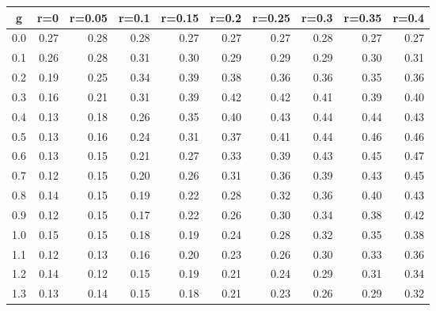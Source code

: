 %
\begin{table}[!tbp]
 \begin{center}
 \begin{tabular}{rrrrrrrrrr}\hline\hline
\multicolumn{1}{c}{g}&\multicolumn{1}{c}{r=0}&\multicolumn{1}{c}{r=0.05}&\multicolumn{1}{c}{r=0.1}&\multicolumn{1}{c}{r=0.15}&\multicolumn{1}{c}{r=0.2}&\multicolumn{1}{c}{r=0.25}&\multicolumn{1}{c}{r=0.3}&\multicolumn{1}{c}{r=0.35}&\multicolumn{1}{c}{r=0.4}\tabularnewline
\hline
0.0&0.27&0.28&0.28&0.27&0.27&0.27&0.28&0.27&0.27\tabularnewline
0.1&0.26&0.28&0.31&0.30&0.29&0.29&0.29&0.30&0.31\tabularnewline
0.2&0.19&0.25&0.34&0.39&0.38&0.36&0.36&0.35&0.36\tabularnewline
0.3&0.16&0.21&0.31&0.39&0.42&0.42&0.41&0.39&0.40\tabularnewline
0.4&0.13&0.18&0.26&0.35&0.40&0.43&0.44&0.44&0.43\tabularnewline
0.5&0.13&0.16&0.24&0.31&0.37&0.41&0.44&0.46&0.46\tabularnewline
0.6&0.13&0.15&0.21&0.27&0.33&0.39&0.43&0.45&0.47\tabularnewline
0.7&0.12&0.15&0.20&0.26&0.31&0.36&0.39&0.43&0.45\tabularnewline
0.8&0.14&0.15&0.19&0.22&0.28&0.32&0.36&0.40&0.43\tabularnewline
0.9&0.12&0.15&0.17&0.22&0.26&0.30&0.34&0.38&0.42\tabularnewline
1.0&0.15&0.15&0.18&0.19&0.24&0.28&0.32&0.35&0.38\tabularnewline
1.1&0.12&0.13&0.16&0.20&0.23&0.26&0.30&0.33&0.36\tabularnewline
1.2&0.14&0.12&0.15&0.19&0.21&0.24&0.29&0.31&0.34\tabularnewline
1.3&0.13&0.14&0.15&0.18&0.21&0.23&0.26&0.29&0.32\tabularnewline
\hline
\end{tabular}

\end{center}

\end{table}

